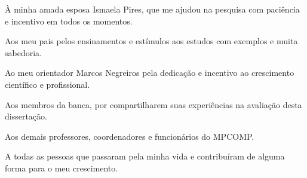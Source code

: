 À minha amada esposa Ismaela Pires, que me ajudou na pesquisa com paciência e incentivo em todos os momentos.

Aos meu pais pelos ensinamentos e estímulos aos estudos com exemplos e muita sabedoria.

Ao meu orientador Marcos Negreiros pela dedicação e incentivo ao crescimento científico e profissional.

Aos membros da banca, por compartilharem suas experiências na avaliação desta dissertação.

Aos demais professores, coordenadores e funcionários do MPCOMP.

A todas as pessoas que passaram pela minha vida e contribuíram de alguma forma para o meu crescimento.

